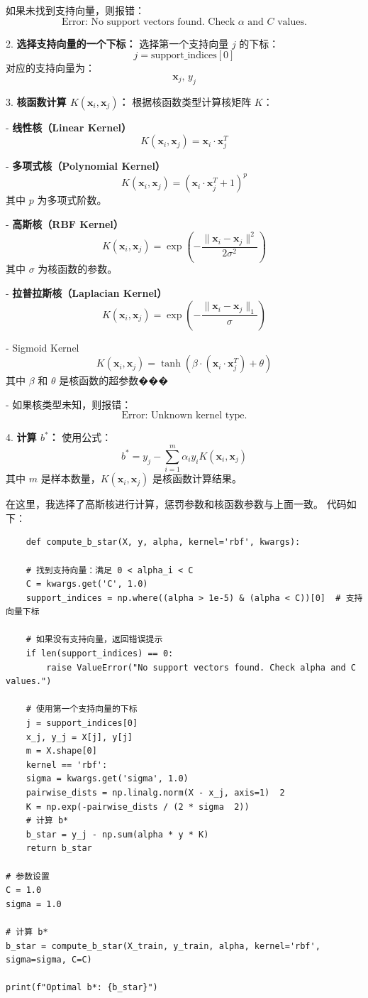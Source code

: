 \documentclass[12pt,a4paper,oneside]{article}
\begin{document}
   如果未找到支持向量，则报错：  
   \[
   \text{Error: No support vectors found. Check } \alpha \text{ and } C \text{ values.}
   \]

2. \textbf{选择支持向量的一个下标：}  
   选择第一个支持向量 \( j \) 的下标：  
   \[
   j = \text{support\_indices}[0]
   \]  
   对应的支持向量为：  
   \[
   \pmb{x}_j, \, y_j
   \]

3. \textbf{核函数计算 \( K(\pmb{x}_i, \pmb{x}_j) \)：}  
   根据核函数类型计算核矩阵 \( K \)：  

   - \textbf{线性核（Linear Kernel）  }
     \[
     K(\pmb{x}_i, \pmb{x}_j) = \pmb{x}_i \cdot \pmb{x}_j^T
     \]

   - \textbf{多项式核（Polynomial Kernel） } 
     \[
     K(\pmb{x}_i, \pmb{x}_j) = (\pmb{x}_i \cdot \pmb{x}_j^T + 1)^p
     \]
     其中 \( p \) 为多项式阶数。

   - \textbf{高斯核（RBF Kernel）  }
     \[
     K(\pmb{x}_i, \pmb{x}_j) = \exp\left(-\frac{\|\pmb{x}_i - \pmb{x}_j\|^2}{2\sigma^2}\right)
     \]
     其中 \( \sigma \) 为核函数的参数。

   - \textbf{拉普拉斯核（Laplacian Kernel）  }
     \[
     K(\pmb{x}_i, \pmb{x}_j) = \exp\left(-\frac{\|\pmb{x}_i - \pmb{x}_j\|_1}{\sigma}\right)
     \]

   - Sigmoid Kernel  
     \[
     K(\pmb{x}_i, \pmb{x}_j) = \tanh(\beta \cdot (\pmb{x}_i \cdot \pmb{x}_j^T) + \theta)
     \]
     其中 \( \beta \) 和 \( \theta \) 是核函数的超参数���

   - 如果核类型未知，则报错：  
     \[
     \text{Error: Unknown kernel type.}
     \]

4. \textbf{计算 \( b^* \)：}  
   使用公式：  
   \[
   b^* = y_j - \sum_{i=1}^m \alpha_i y_i K(\pmb{x}_i, \pmb{x}_j)
   \]
   其中 \( m \) 是样本数量，\( K(\pmb{x}_i, \pmb{x}_j) \) 是核函数计算结果。


在这里，我选择了高斯核进行计算，惩罚参数和核函数参数与上面一致。
代码如下：
\begin{lstlisting}
    def compute_b_star(X, y, alpha, kernel='rbf', kwargs):
 
    # 找到支持向量：满足 0 < alpha_i < C
    C = kwargs.get('C', 1.0)
    support_indices = np.where((alpha > 1e-5) & (alpha < C))[0]  # 支持向量下标

    # 如果没有支持向量，返回错误提示
    if len(support_indices) == 0:
        raise ValueError("No support vectors found. Check alpha and C values.")
    
    # 使用第一个支持向量的下标
    j = support_indices[0]
    x_j, y_j = X[j], y[j]
    m = X.shape[0]
    kernel == 'rbf':
    sigma = kwargs.get('sigma', 1.0)
    pairwise_dists = np.linalg.norm(X - x_j, axis=1)  2
    K = np.exp(-pairwise_dists / (2 * sigma  2))
    # 计算 b*
    b_star = y_j - np.sum(alpha * y * K)
    return b_star

# 参数设置
C = 1.0
sigma = 1.0

# 计算 b*
b_star = compute_b_star(X_train, y_train, alpha, kernel='rbf', sigma=sigma, C=C)

print(f"Optimal b*: {b_star}")
\end{lstlisting}
\end{document}
